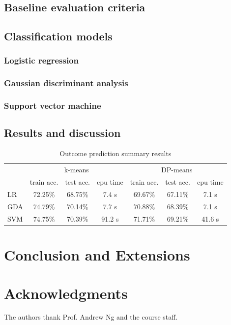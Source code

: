 \documentclass[letterpaper,10 pt,conference]{ieeeconf}
\begin{document}
\subsection{Baseline evaluation criteria}



\subsection{Classification models}

\subsubsection{Logistic regression}



\subsubsection{Gaussian discriminant analysis}



\subsubsection{Support vector machine}



\subsection{Results and discussion}



\begin{table}[htbp!]
  \centering
  \caption{Outcome prediction summary results}
  \begin{tabular}{lcccccc}
    \toprule
    & \multicolumn{3}{c}{k-means} & \multicolumn{3}{c}{DP-means} \\
    & train acc. & test acc. & cpu time & train acc. & test acc. & cpu time \\ \midrule
    LR & 72.25\% & 68.75\% & 7.4 s & 69.67\% & 67.11\% & 7.1 s \\
    GDA & 74.79\% & 70.14\% & 7.7 s & 70.88\% & 68.39\% & 7.1 s \\
    SVM & 74.75\% & 70.39\% & 91.2 s & 71.71\% & 69.21\% & 41.6 s \\
    \bottomrule
  \end{tabular}
  \label{tab:pred}
\end{table}

\section{Conclusion and Extensions}



\section*{Acknowledgments}
The authors thank Prof. Andrew Ng and the course staff.


\end{document}
